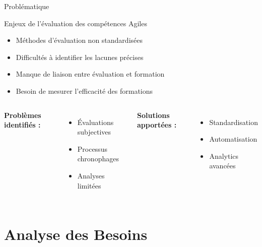 \documentclass[aspectratio=169]{beamer}
\begin{document}
\begin{frame}{Problématique}
    \begin{block}{Enjeux de l'évaluation des compétences Agiles}
        \begin{itemize}
            \item Méthodes d'évaluation non standardisées
            \item Difficultés à identifier les lacunes précises
            \item Manque de liaison entre évaluation et formation
            \item Besoin de mesurer l'efficacité des formations
        \end{itemize}
    \end{block}

    \begin{columns}
        \textbf{Problèmes identifiés :}
        \begin{itemize}
            \item Évaluations subjectives
            \item Processus chronophages
            \item Analyses limitées
        \end{itemize}

        \textbf{Solutions apportées :}
        \begin{itemize}
            \item Standardisation
            \item Automatisation
            \item Analytics avancées
        \end{itemize}
    \end{columns}
\end{frame}

\section{Analyse des Besoins}
\end{document}
